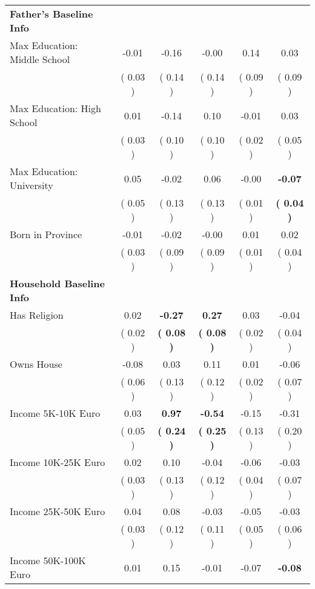 \begin{table}[H]
{\begin{tabular}{lccccc}
\midrule
\textbf{Father's Baseline Info} \\
\quad Max Education: Middle School &     -0.01 &     -0.16 &     -0.00 &      0.14 &      0.03 \\
\quad  & (     0.03 ) & (     0.14 )  & (     0.14 )  & (     0.09 ) & (     0.09 ) \\
\quad Max Education: High School &      0.01 &     -0.14 &      0.10 &     -0.01 &      0.03 \\
\quad  & (     0.03 ) & (     0.10 )  & (     0.10 )  & (     0.02 ) & (     0.05 ) \\
\quad Max Education: University &      0.05 &     -0.02 &      0.06 &     -0.00 & \textbf{    -0.07} \\
\quad  & (     0.05 ) & (     0.13 )  & (     0.13 )  & (     0.01 ) & \textbf{(     0.04 )} \\
\quad Born in Province &     -0.01 &     -0.02 &     -0.00 &      0.01 &      0.02 \\
\quad  & (     0.03 ) & (     0.09 )  & (     0.09 )  & (     0.01 ) & (     0.04 ) \\
\midrule
\textbf{Household Baseline Info} \\
\quad Has Religion &      0.02 & \textbf{    -0.27} & \textbf{     0.27} &      0.03 &     -0.04 \\
\quad  & (     0.02 ) & \textbf{(     0.08 )}  & \textbf{(     0.08 )}  & (     0.02 ) & (     0.04 ) \\
\quad Owns House &     -0.08 &      0.03 &      0.11 &      0.01 &     -0.06 \\
\quad  & (     0.06 ) & (     0.13 )  & (     0.12 )  & (     0.02 ) & (     0.07 ) \\
\quad Income 5K-10K Euro &      0.03 & \textbf{     0.97} & \textbf{    -0.54} &     -0.15 &     -0.31 \\
\quad  & (     0.05 ) & \textbf{(     0.24 )}  & \textbf{(     0.25 )}  & (     0.13 ) & (     0.20 ) \\
\quad Income 10K-25K Euro &      0.02 &      0.10 &     -0.04 &     -0.06 &     -0.03 \\
\quad  & (     0.03 ) & (     0.13 )  & (     0.12 )  & (     0.04 ) & (     0.07 ) \\
\quad Income 25K-50K Euro &      0.04 &      0.08 &     -0.03 &     -0.05 &     -0.03 \\
\quad  & (     0.03 ) & (     0.12 )  & (     0.11 )  & (     0.05 ) & (     0.06 ) \\
\quad Income 50K-100K Euro &      0.01 &      0.15 &     -0.01 &     -0.07 & \textbf{    -0.08} \\

\end{tabular}}
\end{table}
